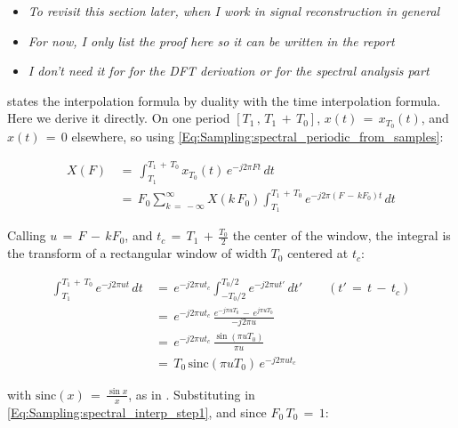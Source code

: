  

\begin{itemize}

\item \textit{To revisit this section later, when I work in signal reconstruction in general}

\item \textit{For now, I only list the proof here so it can be written in the report}

\item \textit{I don't need it for for the DFT derivation or for the spectral analysis part}

\end{itemize}


\cite{signal_processing_Lathi} states the interpolation formula by duality with the time interpolation formula. Here we derive it directly. On one period $[T_1 \, , \, T_1 \, + \, T_0]$, $x(t) \, = \, x_{T_0}(t)$, and $x(t) \, = \, 0$ elsewhere, so using \autoref{Eq:Sampling:spectral_periodic_from_samples}:

\begin{align}
X(F) \, &= \, \int_{T_1}^{T_1 \, + \, T_0} x_{T_0}(t) \, e^{-j 2 \pi F t} \, dt \nonumber \\
&= \, F_0 \sum_{k \, = \, -\infty}^{\infty} X(k \, F_0) \int_{T_1}^{T_1 \, + \, T_0} e^{-j 2 \pi (F \, - \, k F_0) t} \, dt
\label{Eq:Sampling:spectral_interp_step1}
\end{align}

Calling $u \, = \, F \, - \, k F_0$, and $t_c \, = \, T_1 \, + \, \frac{T_0}{2}$ the center of the window, the integral is the transform of a rectangular window of width $T_0$ centered at $t_c$:

\begin{align}
\int_{T_1}^{T_1 \, + \, T_0} e^{-j 2 \pi u t} \, dt \, &= \, e^{-j 2 \pi u t_c} \int_{-T_0/2}^{T_0/2} e^{-j 2 \pi u t'} \, dt' \qquad (t' \, = \, t \, - \, t_c) \nonumber \\
&= \, e^{-j 2 \pi u t_c} \, \frac{e^{-j \pi u T_0} \, - \, e^{j \pi u T_0}}{-j 2 \pi u} \nonumber \\
&= \, e^{-j 2 \pi u t_c} \, \frac{\sin(\pi u T_0)}{\pi u} \nonumber \\
&= \, T_0 \, \text{sinc}(\pi u T_0) \, e^{-j 2 \pi u t_c}
\label{Eq:Sampling:spectral_interp_window}
\end{align}

with $\text{sinc}(x) \, = \, \frac{\sin x}{x}$, as in \cite{signal_processing_Lathi}. Substituting in \autoref{Eq:Sampling:spectral_interp_step1}, and since $F_0 \, T_0 \, = \, 1$:

